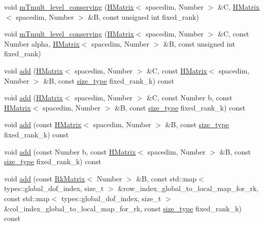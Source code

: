 \begin{DoxyCompactItemize}
\item 
void \hyperlink{classHMatrix_a0b7fe2940b614a130d154a29b28b39d4}{m\+Tmult\+\_\+level\+\_\+conserving} (\hyperlink{classHMatrix}{H\+Matrix}$<$ spacedim, Number $>$ \&C, \hyperlink{classHMatrix}{H\+Matrix}$<$ spacedim, Number $>$ \&B, const unsigned int fixed\+\_\+rank)
\item 
void \hyperlink{classHMatrix_aae163c33fc8d51f96df712ca192e0b6f}{m\+Tmult\+\_\+level\+\_\+conserving} (\hyperlink{classHMatrix}{H\+Matrix}$<$ spacedim, Number $>$ \&C, const Number alpha, \hyperlink{classHMatrix}{H\+Matrix}$<$ spacedim, Number $>$ \&B, const unsigned int fixed\+\_\+rank)
\item 
void \hyperlink{classHMatrix_a8f96186426cd3147d5af32ca84ad25ea}{add} (\hyperlink{classHMatrix}{H\+Matrix}$<$ spacedim, Number $>$ \&C, const \hyperlink{classHMatrix}{H\+Matrix}$<$ spacedim, Number $>$ \&B, const \hyperlink{classHMatrix_a5ca8dc549783d38371a01ecd621ecb34}{size\+\_\+type} fixed\+\_\+rank\+\_\+k) const
\item 
void \hyperlink{classHMatrix_aea42f5112b88270fef73342853fa386d}{add} (\hyperlink{classHMatrix}{H\+Matrix}$<$ spacedim, Number $>$ \&C, const Number b, const \hyperlink{classHMatrix}{H\+Matrix}$<$ spacedim, Number $>$ \&B, const \hyperlink{classHMatrix_a5ca8dc549783d38371a01ecd621ecb34}{size\+\_\+type} fixed\+\_\+rank\+\_\+k) const
\item 
void \hyperlink{classHMatrix_a9bd48ada567962ab0dc75c31986bd1a6}{add} (const \hyperlink{classHMatrix}{H\+Matrix}$<$ spacedim, Number $>$ \&B, const \hyperlink{classHMatrix_a5ca8dc549783d38371a01ecd621ecb34}{size\+\_\+type} fixed\+\_\+rank\+\_\+k) const
\item 
void \hyperlink{classHMatrix_af42aaa86b9f47c5c1514e4f06e343db6}{add} (const Number b, const \hyperlink{classHMatrix}{H\+Matrix}$<$ spacedim, Number $>$ \&B, const \hyperlink{classHMatrix_a5ca8dc549783d38371a01ecd621ecb34}{size\+\_\+type} fixed\+\_\+rank\+\_\+k) const
\item 
void \hyperlink{classHMatrix_a1793dff400aeae649f909d7f45db8b8a}{add} (const \hyperlink{classRkMatrix}{Rk\+Matrix}$<$ Number $>$ \&B, const std\+::map$<$ types\+::global\+\_\+dof\+\_\+index, size\+\_\+t $>$ \&row\+\_\+index\+\_\+global\+\_\+to\+\_\+local\+\_\+map\+\_\+for\+\_\+rk, const std\+::map$<$ types\+::global\+\_\+dof\+\_\+index, size\+\_\+t $>$ \&col\+\_\+index\+\_\+global\+\_\+to\+\_\+local\+\_\+map\+\_\+for\+\_\+rk, const \hyperlink{classHMatrix_a5ca8dc549783d38371a01ecd621ecb34}{size\+\_\+type} fixed\+\_\+rank\+\_\+k) const
\item 

\end{DoxyCompactItemize}
